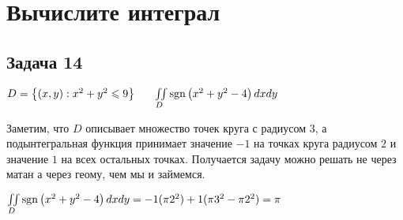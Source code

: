 \documentclass[a4paper, fleqn]{article}
\begin{document}
    
    
    
    \section*{Вычислите интеграл}
    
    \subsection*{Задача 14}
    $D = \left\{ (x, y): x^2 + y^2 \leqslant 9 \right\} \;\;\;\;\;\; \iint \limits_D \operatorname{\mathop{\mathrm{sgn}}} \left( x^2 + y^2 - 4 \right) dx dy$ 

    Заметим, что $D$ описывает множество точек круга с радиусом $3$, а подынтегральная функция принимает значение 
    $-1$ на точках круга радиусом $2$ и значение $1$ на всех остальных точках. 
    Получается задачу можно решать не через матан а через геому, чем мы и займемся.

    $\iint \limits_D \operatorname{\mathop{\mathrm{sgn}}} \left( x^2 + y^2 - 4 \right) dx dy = - 1 (\pi 2^2) + 1 (\pi 3^2 - \pi 2^2) = \pi$

    
\end{document}
